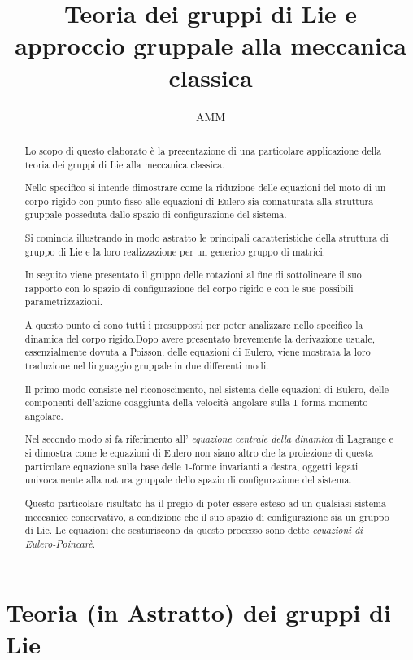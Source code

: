 \documentclass[11pt]{report}
\title{Teoria dei gruppi di Lie e approccio gruppale alla meccanica classica}
\author{AMM}
\theoremstyle{plain}
\theoremstyle{definition}
\theoremstyle{remark}
\begin{document}




\begin{abstract}
Lo scopo di questo elaborato è la presentazione di una particolare applicazione della teoria dei gruppi di Lie alla meccanica classica.

Nello specifico si intende dimostrare come la riduzione delle equazioni del moto di un corpo rigido con punto fisso alle equazioni di Eulero sia connaturata alla struttura gruppale posseduta dallo spazio di configurazione del sistema.

Si comincia illustrando in modo astratto le principali caratteristiche della struttura di gruppo di Lie e la loro realizzazione per un generico gruppo di matrici.

In seguito viene presentato il gruppo delle rotazioni al fine di sottolineare il suo rapporto con lo spazio di configurazione del corpo rigido e con le sue possibili parametrizzazioni.

A questo punto ci sono tutti i presupposti per poter analizzare nello specifico la dinamica del corpo rigido.Dopo avere presentato brevemente la derivazione usuale, essenzialmente dovuta a Poisson, delle equazioni di Eulero, viene mostrata la loro traduzione nel linguaggio gruppale in due differenti modi.

Il primo modo consiste nel riconoscimento, nel sistema delle equazioni di Eulero, delle componenti dell'azione coaggiunta della velocità angolare sulla 1-forma momento angolare.

Nel secondo modo si fa riferimento all' \emph{equazione centrale della dinamica} di Lagrange e si dimostra come le equazioni di Eulero non siano altro che la proiezione di questa particolare equazione sulla base delle 1-forme invarianti a destra, oggetti legati univocamente alla natura gruppale dello spazio di configurazione del sistema.

Questo particolare risultato ha il pregio di poter essere esteso ad un qualsiasi sistema meccanico conservativo, a condizione che il suo spazio di configurazione sia un gruppo di Lie. Le equazioni che scaturiscono da questo processo sono dette \emph{equazioni di Eulero-Poincarè}.
\end{abstract}

\tableofcontents


\chapter{Teoria (in Astratto) dei gruppi di Lie}
\end{document}
